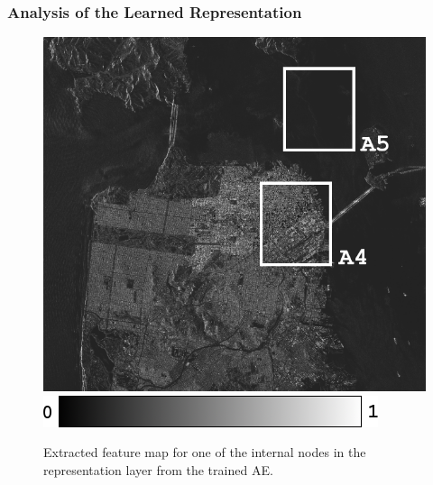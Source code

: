 \subsubsection{Analysis of the Learned Representation}
\label{sec:EXPT3}

\begin{figure}[tbp]
	\centering
	\includegraphics[width=0.85\columnwidth]{Figures/Wr_decode3_11_g}
	\\
	\includegraphics[width = 0.3\columnwidth]{Figures/Rotation_FS/GRAY}
	\caption{Extracted feature map for one of the internal nodes in the representation layer from the trained AE.}
	\label{fig:wr}
\end{figure}

